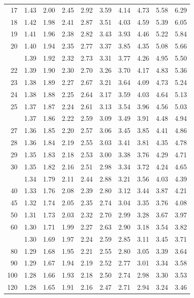 \documentclass[10pt]{article}
\begin{document}
\begin{longtable}{@{}r!{\vrule width 0.8pt\hspace{0.55em}}rrrrrrrrr@{}}
17 & 1.43 & 2.00 & 2.45 & 2.92 & 3.59 & 4.14 & 4.73 & 5.58 & 6.29 \\
18 & 1.42 & 1.98 & 2.41 & 2.87 & 3.51 & 4.03 & 4.59 & 5.39 & 6.05 \\
19 & 1.41 & 1.96 & 2.38 & 2.82 & 3.43 & 3.93 & 4.46 & 5.22 & 5.84 \\
20 & 1.40 & 1.94 & 2.35 & 2.77 & 3.37 & 3.85 & 4.35 & 5.08 & 5.66 \\
 & 1.39 & 1.92 & 2.32 & 2.73 & 3.31 & 3.77 & 4.26 & 4.95 & 5.50 \\
22 & 1.39 & 1.90 & 2.30 & 2.70 & 3.26 & 3.70 & 4.17 & 4.83 & 5.36 \\
23 & 1.38 & 1.89 & 2.27 & 2.67 & 3.21 & 3.64 & 4.09 & 4.73 & 5.24 \\
24 & 1.38 & 1.88 & 2.25 & 2.64 & 3.17 & 3.59 & 4.03 & 4.64 & 5.13 \\
25 & 1.37 & 1.87 & 2.24 & 2.61 & 3.13 & 3.54 & 3.96 & 4.56 & 5.03 \\
 & 1.37 & 1.86 & 2.22 & 2.59 & 3.09 & 3.49 & 3.91 & 4.48 & 4.94 \\
27 & 1.36 & 1.85 & 2.20 & 2.57 & 3.06 & 3.45 & 3.85 & 4.41 & 4.86 \\
28 & 1.36 & 1.84 & 2.19 & 2.55 & 3.03 & 3.41 & 3.81 & 4.35 & 4.78 \\
29 & 1.35 & 1.83 & 2.18 & 2.53 & 3.00 & 3.38 & 3.76 & 4.29 & 4.71 \\
30 & 1.35 & 1.82 & 2.16 & 2.51 & 2.98 & 3.34 & 3.72 & 4.24 & 4.65 \\
 & 1.34 & 1.79 & 2.11 & 2.44 & 2.88 & 3.21 & 3.56 & 4.03 & 4.39 \\
40 & 1.33 & 1.76 & 2.08 & 2.39 & 2.80 & 3.12 & 3.44 & 3.87 & 4.21 \\
45 & 1.32 & 1.74 & 2.05 & 2.35 & 2.74 & 3.04 & 3.35 & 3.76 & 4.08 \\
50 & 1.31 & 1.73 & 2.03 & 2.32 & 2.70 & 2.99 & 3.28 & 3.67 & 3.97 \\
60 & 1.30 & 1.71 & 1.99 & 2.27 & 2.63 & 2.90 & 3.18 & 3.54 & 3.82 \\
 & 1.30 & 1.69 & 1.97 & 2.24 & 2.59 & 2.85 & 3.11 & 3.45 & 3.71 \\
80 & 1.29 & 1.68 & 1.95 & 2.21 & 2.55 & 2.80 & 3.05 & 3.39 & 3.64 \\
90 & 1.29 & 1.67 & 1.94 & 2.19 & 2.52 & 2.77 & 3.01 & 3.34 & 3.58 \\
100 & 1.28 & 1.66 & 1.93 & 2.18 & 2.50 & 2.74 & 2.98 & 3.30 & 3.53 \\
120 & 1.28 & 1.65 & 1.91 & 2.16 & 2.47 & 2.71 & 2.94 & 3.24 & 3.46 \\

\end{longtable}
\end{document}
